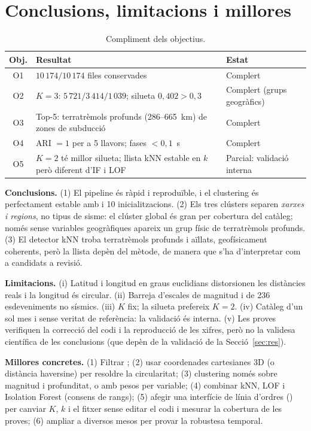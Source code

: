 \documentclass[10.5pt,a4paper]{article}
\newcommand{\py}[1]{\texttt{\detokenize{#1}}}
\begin{document}
\section{Conclusions, limitacions i millores}\label{sec:lim}
\begin{table}[H]
\centering\footnotesize
\begin{tabular}{@{}cp{9.2cm}p{4.6cm}@{}}
\toprule
Obj. & Resultat & Estat\\
\midrule
O1 & $10\,174/10\,174$ files conservades & Complert\\
O2 & $K=3$: $5\,721/3\,414/1\,039$; silueta $0{,}402>0{,}3$ & Complert (grups geogràfics)\\
O3 & Top-5: terratrèmols profunds (286--665~km) de zones de subducció & Complert\\
O4 & ARI $=1$ per a 5 llavors; fases $<0{,}1$~s & Complert\\
O5 & $K=2$ té millor silueta; llista kNN estable en $k$ però diferent d'IF i LOF & Parcial: validació interna\\
\bottomrule
\end{tabular}
\caption{Compliment dels objectius.}\label{tab:obj}
\end{table}
\textbf{Conclusions.} (1) El pipeline és ràpid i reproduïble, i el clustering és perfectament estable amb \py{k-means++} i 10 inicialitzacions. (2) Els tres clústers separen \emph{xarxes i regions}, no tipus de sisme: el clúster global és gran per cobertura del catàleg; només sense variables geogràfiques apareix un grup físic de terratrèmols profunds. (3) El detector kNN troba terratrèmols profunds i aïllats, geofísicament coherents, però la llista depèn del mètode, de manera que s'ha d'interpretar com a candidats a revisió.

\textbf{Limitacions.} (i) Latitud i longitud en graus euclidians distorsionen les distàncies reals i la longitud és circular. (ii) Barreja d'escales de magnitud i de 236 esdeveniments no sísmics. (iii) $K$ fix; la silueta prefereix $K=2$. (iv) Catàleg d'un sol mes i sense veritat de referència: la validació és interna. (v) Les proves verifiquen la correcció del codi i la reproducció de les xifres, però no la validesa científica de les conclusions (que depèn de la validació de la Secció~\ref{sec:res}).

\textbf{Millores concretes.} (1) Filtrar \py{type == "earthquake"}; (2) usar coordenades cartesianes 3D (o distància haversine) per resoldre la circularitat; (3) clustering només sobre magnitud i profunditat, o amb pesos per variable; (4) combinar kNN, LOF i Isolation Forest (consens de rangs); (5) afegir una interfície de línia d'ordres (\py{argparse}) per canviar $K$, $k$ i el fitxer sense editar el codi i mesurar la cobertura de les proves; (6) ampliar a diversos mesos per provar la robustesa temporal.
\end{document}
